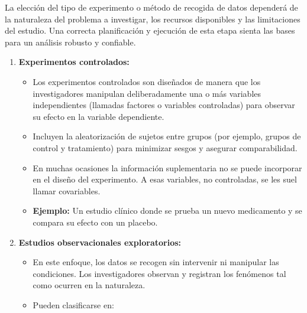 \documentclass[
  letterpaper,
  DIV=11,
  numbers=noendperiod]{scrreprt}
\providecommand{\tightlist}{%
  \setlength{\itemsep}{0pt}\setlength{\parskip}{0pt}}
\begin{document}
\begin{tcolorbox}[enhanced jigsaw, leftrule=.75mm, breakable, colbacktitle=quarto-callout-note-color!10!white, bottomrule=.15mm, colframe=quarto-callout-note-color-frame, toprule=.15mm, colback=white, coltitle=black, bottomtitle=1mm, left=2mm, title=\textcolor{quarto-callout-note-color}{\faInfo}\hspace{0.5em}{Tipos de experimentos}, opacityback=0, arc=.35mm, opacitybacktitle=0.6, toptitle=1mm, titlerule=0mm, rightrule=.15mm]

La elección del tipo de experimento o método de recogida de datos
dependerá de la naturaleza del problema a investigar, los recursos
disponibles y las limitaciones del estudio. Una correcta planificación y
ejecución de esta etapa sienta las bases para un análisis robusto y
confiable.

\begin{enumerate}
\def\labelenumi{\arabic{enumi}.}
\tightlist
\item
  \textbf{Experimentos controlados:}

  \begin{itemize}
  \tightlist
  \item
    Los experimentos controlados son diseñados de manera que los
    investigadores manipulan deliberadamente una o más variables
    independientes (llamadas factores o variables controladas) para
    observar su efecto en la variable dependiente.
  \item
    Incluyen la aleatorización de sujetos entre grupos (por ejemplo,
    grupos de control y tratamiento) para minimizar sesgos y asegurar
    comparabilidad.
  \item
    En muchas ocasiones la información suplementaria no se puede
    incorporar en el diseño del experimento. A esas variables, no
    controladas, se les suel llamar covariables.
  \item
    \textbf{Ejemplo:} Un estudio clínico donde se prueba un nuevo
    medicamento y se compara su efecto con un placebo.
  \end{itemize}
\item
  \textbf{Estudios observacionales exploratorios:}

  \begin{itemize}
  \tightlist
  \item
    En este enfoque, los datos se recogen sin intervenir ni manipular
    las condiciones. Los investigadores observan y registran los
    fenómenos tal como ocurren en la naturaleza.
  \item
    Pueden clasificarse en:


\end{itemize}
\end{enumerate}
\end{tcolorbox}
\end{document}
